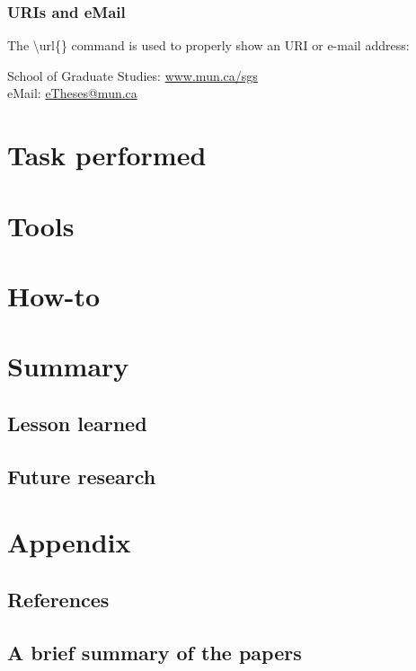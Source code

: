 \documentclass[12pt]{cls}
\begin{document}
\subsection{URIs and eMail}
The \textbackslash url\{\} command is used to properly show an URI or e-mail address:

School of Graduate Studies: \url{www.mun.ca/sgs}\\
eMail: \url{eTheses@mun.ca}


\chapter{Task performed}
\chapter{Tools}
\chapter{How-to}

\chapter{Summary}
\section{Lesson learned}
\section{Future research}

\chapter{Appendix}
\section{References}
\section{A brief summary of the papers}

\cleardoublepage

 
\end{document}
